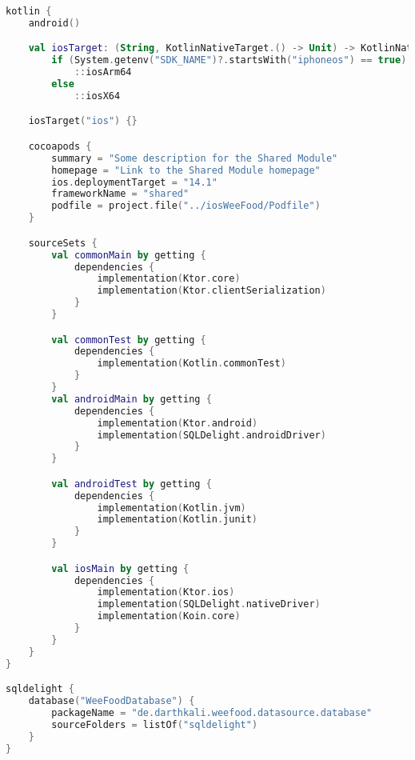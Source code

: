 \begin{lstlisting}[caption={Build Src - Common Module},label={lst:build_src_common}, language=kotlin]
kotlin {
    android()

    val iosTarget: (String, KotlinNativeTarget.() -> Unit) -> KotlinNativeTarget =
        if (System.getenv("SDK_NAME")?.startsWith("iphoneos") == true)
            ::iosArm64
        else
            ::iosX64

    iosTarget("ios") {}

    cocoapods {
        summary = "Some description for the Shared Module"
        homepage = "Link to the Shared Module homepage"
        ios.deploymentTarget = "14.1"
        frameworkName = "shared"
        podfile = project.file("../iosWeeFood/Podfile")
    }

    sourceSets {
        val commonMain by getting {
            dependencies {
                implementation(Ktor.core)
                implementation(Ktor.clientSerialization)
            }
        }

        val commonTest by getting {
            dependencies {
                implementation(Kotlin.commonTest)
            }
        }
        val androidMain by getting {
            dependencies {
                implementation(Ktor.android)
                implementation(SQLDelight.androidDriver)
            }
        }

        val androidTest by getting {
            dependencies {
                implementation(Kotlin.jvm)
                implementation(Kotlin.junit)
            }
        }

        val iosMain by getting {
            dependencies {
                implementation(Ktor.ios)
                implementation(SQLDelight.nativeDriver)
                implementation(Koin.core)
            }
        }
    }
}

sqldelight {
    database("WeeFoodDatabase") {
        packageName = "de.darthkali.weefood.datasource.database"
        sourceFolders = listOf("sqldelight")
    }
}
\end{lstlisting}